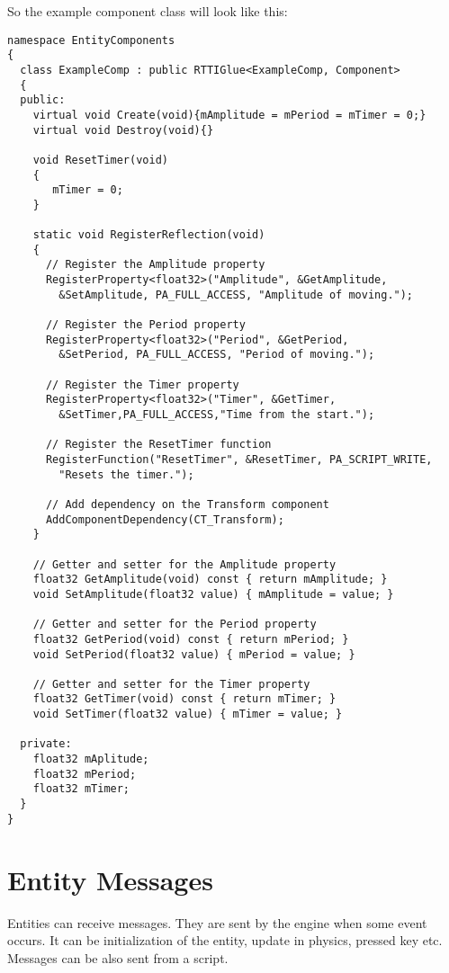 \documentclass[a4paper, 12pt]{report}
\begin{document}
So the example component class will look like this: 

\footnotesize 
\begin{verbatim}
namespace EntityComponents
{
  class ExampleComp : public RTTIGlue<ExampleComp, Component>
  {
  public:
    virtual void Create(void){mAmplitude = mPeriod = mTimer = 0;}
    virtual void Destroy(void){}

    void ResetTimer(void)
    {
       mTimer = 0;
    }

    static void RegisterReflection(void)
    {
      // Register the Amplitude property
      RegisterProperty<float32>("Amplitude", &GetAmplitude,
        &SetAmplitude, PA_FULL_ACCESS, "Amplitude of moving.");

      // Register the Period property
      RegisterProperty<float32>("Period", &GetPeriod, 
        &SetPeriod, PA_FULL_ACCESS, "Period of moving.");

      // Register the Timer property
      RegisterProperty<float32>("Timer", &GetTimer, 
        &SetTimer,PA_FULL_ACCESS,"Time from the start.");

      // Register the ResetTimer function
      RegisterFunction("ResetTimer", &ResetTimer, PA_SCRIPT_WRITE,
        "Resets the timer.");

      // Add dependency on the Transform component
      AddComponentDependency(CT_Transform);
    }

    // Getter and setter for the Amplitude property
    float32 GetAmplitude(void) const { return mAmplitude; }
    void SetAmplitude(float32 value) { mAmplitude = value; }

    // Getter and setter for the Period property
    float32 GetPeriod(void) const { return mPeriod; }
    void SetPeriod(float32 value) { mPeriod = value; }

    // Getter and setter for the Timer property	
    float32 GetTimer(void) const { return mTimer; }
    void SetTimer(float32 value) { mTimer = value; }

  private:
    float32 mAplitude;
    float32 mPeriod;
    float32 mTimer;
  }
}
\end{verbatim}
\normalsize

\section{Entity Messages}

Entities can receive messages. They are sent by the engine when some event occurs. It can be initialization of the entity, update in physics, pressed key etc. Messages can be also sent from a script.
\end{document}
